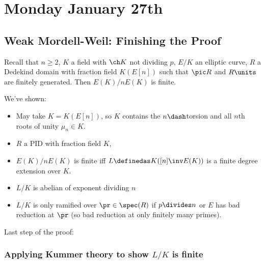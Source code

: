 \hypertarget{monday-january-27th}{%
\section{Monday January 27th}\label{monday-january-27th}}

\hypertarget{weak-mordell-weil-finishing-the-proof}{%
\subsection{Weak Mordell-Weil: Finishing the
Proof}\label{weak-mordell-weil-finishing-the-proof}}

Recall that \(n\geq 2\), \(K\) a field with \(\ch K\) not dividing
\(p\), \(E/K\) an elliptic curve, \(R\) a Dedekind domain with fraction
field \(K(E[n])\) such that \(\pic R\) and \(R\units\) are finitely
generated. Then \(E(K) / nE(K)\) is finite.

We've shown:

\begin{itemize}
\tightlist
\item
  May take \(K = K(E[n])\), so \(K\) contains the \(n\dash\)torsion and
  all \(n\)th roots of unity \(\mu_n \in K\).
\item
  \(R\) a PID with fraction field \(K\),
\item
  \(E(K) / n E(K)\) is finite iff \(L\definedas K([n]\inv E(K))\) is a
  finite degree extension over \(K\).
\item
  \(L/K\) is abelian of exponent dividing \(n\)
\item
  \(L/K\) is only ramified over \(\pr \in \spec(R)\) if \(p\divides n\)
  or \(E\) has bad reduction at \(\pr\) (so bad reduction at only
  finitely many primes).
\end{itemize}

Last step of the proof:

\hypertarget{applying-kummer-theory-to-show-lk-is-finite}{%
\subsubsection{\texorpdfstring{Applying Kummer theory to show \(L/K\) is
finite}{Applying Kummer theory to show L/K is finite}}\label{applying-kummer-theory-to-show-lk-is-finite}}

